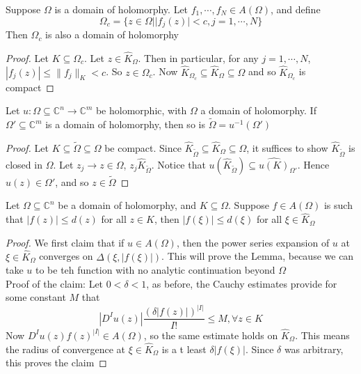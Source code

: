 \documentclass[../main.tex]{subfiles}
\begin{document}
\begin{claim}
Suppose $\Omega$ is a domain of holomorphy. Let $f_1,\cdots,f_N\in A(\Omega)$, and define
\[\Omega_c=\{z\in\Omega||f_j(z)|<c,j=1,\cdots,N\}\]
Then $\Omega_c$ is also a domain of holomorphy
\end{claim}

\begin{proof}
Let $K\subseteq\Omega_c$. Let $z\in\hat K_\Omega$. Then in particular, for any $j=1,\cdots,N$, $|f_j(z)|\leq\|f_j\|_K<c$. So $z\in\Omega_c$. Now $\hat K_{\Omega_c}\subseteq\hat K_\Omega\subseteq\Omega$ and so $\hat K_{\Omega_c}$ is compact
\end{proof}

\begin{claim}
Let $u:\Omega\subseteq\mathbb C^n\to\mathbb C^m$ be holomorphic, with $\Omega$ a domain of holomorphy. If $\Omega'\subseteq\mathbb C^m$ is a domain of holomorphy, then so is $\tilde\Omega=u^{-1}(\Omega')$
\end{claim}

\begin{proof}
Let $K\subseteq\tilde\Omega\subseteq\Omega$ be compact. Since $\hat K_{\tilde\Omega}\subseteq\hat K_\Omega\subseteq\Omega$, it suffices to show $\hat K_{\tilde\Omega}$ is closed in $\Omega$. Let $z_j\to z\in\Omega$, $z_j\hat K_{\tilde\Omega}$. Notice that $u(\hat K_{\tilde\Omega})\subseteq\widehat{u(K)}_{\Omega'}$. Hence $u(z)\in\Omega'$, and so $z\in\tilde\Omega$
\end{proof}

\begin{lemma}
Let $\Omega\subseteq\mathbb C^n$ be a domain of holomorphy, and $K\subseteq\Omega$. Suppose $f\in A(\Omega)$ is such that $|f(z)|\leq d(z)$ for all $z\in K$, then $|f(\xi)|\leq d(\xi)$ for all $\xi\in\hat K_\Omega$
\end{lemma}

\begin{proof}
We first claim that if $u\in A(\Omega)$, then the power series expansion of $u$ at $\xi\in\hat K_\Omega$ converges on $\Delta(\xi,|f(\xi)|)$. This will prove the Lemma, because we can take $u$ to be teh function with no analytic continuation beyond $\Omega$ \\
Proof of the claim: Let $0<\delta<1$, as before, the Cauchy estimates provide for some constant $M$ that
\[|D^Iu(z)|\frac{(\delta|f(z)|)^{|I|}}{I!}\leq M,\forall z\in K\]
Now $D^Iu(z)f(z)^{|I|}\in A(\Omega)$, so the same estimate holds on $\hat K_\Omega$. This means the radius of convergence at $\xi\in \hat K_\Omega$ is a t least $\delta|f(\xi)|$. Since $\delta$ was arbitrary, this proves the claim
\end{proof}
\end{document}
